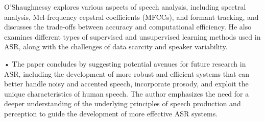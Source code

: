 O'Shaughnessy explores various aspects of speech analysis, including spectral analysis, Mel-frequency cepstral coefficients (MFCCs), and formant tracking, and discusses the trade-offs between accuracy and computational efficiency. He also examines different types of supervised and unsupervised learning methods used in ASR, along with the challenges of data scarcity and speaker variability.

•	The paper concludes by suggesting potential avenues for future research in ASR, including the development of more robust and efficient systems that can better handle noisy and accented speech, incorporate prosody, and exploit the unique characteristics of human speech. The author emphasizes the need for a deeper understanding of the underlying principles of speech production and perception to guide the development of more effective ASR systems.

